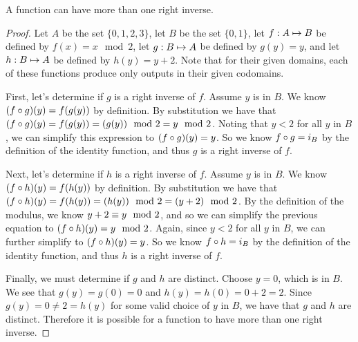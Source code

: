 \documentclass[main.tex]{subfiles}
\begin{document}
\begin{thm}
	A function can have more than one right inverse.
\end{thm}
\begin{proof}
	Let \(A\) be the set \(\{0,1,2,3\}\), let \(B\) be the set \(\{0,1\}\),
	let \({f}: {A} \mapsto{} {B}\) be defined by \(f(x) = x \mod 2\), let
	\({g}: {B} \mapsto{} {A}\) be defined by \(g(y) = y\), and let
	\({h}: {B} \mapsto{} {A}\) be defined by \(h(y) = y + 2\).  Note that for
	their given domains, each of these functions produce only outputs in
	their given codomains.

	First, let's determine if \(g\) is a right inverse of \(f\). Assume
	\(y\) is in \(B\). We know \(({f} \circ{} {g})({y}) = f(g(y))\) by
	definition. By substitution we have that
	\(({f} \circ{} {g})({y}) = f(g(y)) = (g(y)) \mod 2 = y \mod 2\). Noting
	that \(y < 2\) for all \(y\) in \(B\), we can simplify this expression
	to \(({f} \circ{} {g})({y}) = y\). So we know \({f} \circ{} {g} = i_B\)
	by the definition of the identity function, and thus \(g\) is a right
	inverse of \(f\).

	Next, let's determine if \(h\) is a right inverse of \(f\). Assume \(y\)
	is in \(B\). We know \(({f} \circ{} {h})({y}) = f(h(y))\) by definition.
	By substitution we have that
	\(({f} \circ{} {h})({y}) = f(h(y)) = (h(y)) \mod 2 = (y + 2) \mod 2\).
	By the definition of the modulus, we know \({y + 2} \equiv {y} \mod {2}\), and
	so we can simplify the previous equation to
	\(({f} \circ{} {h})({y}) = y \mod 2\). Again, since \(y < 2\) for all
	\(y\) in \(B\), we can further simplify to
	\(({f} \circ{} {h})({y}) = y\). So we know \({f} \circ{} {h} = i_B\) by
	the definition of the identity function, and thus \(h\) is a right
	inverse of \(f\).

	Finally, we must determine if \(g\) and \(h\) are distinct. Choose
	\(y = 0\), which is in \(B\). We see that \(g(y) = g(0) = 0\) and
	\(h(y) = h(0) = 0 + 2 = 2\). Since \(g(y) = 0 \neq 2 = h(y)\) for some
	valid choice of \(y\) in \(B\), we have that \(g\) and \(h\) are
	distinct. Therefore it is possible for a function to have more than one
	right inverse.
\end{proof}
\end{document}
